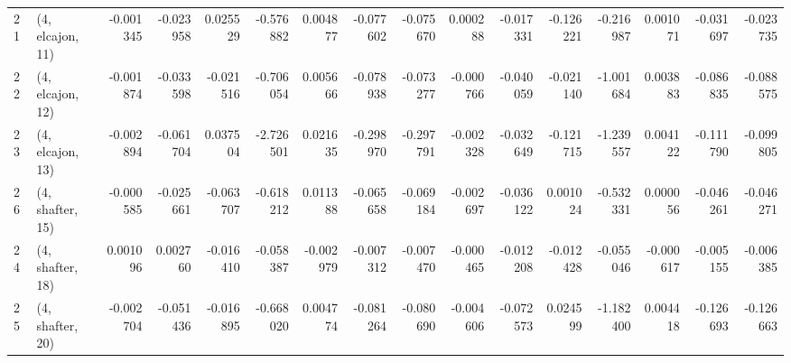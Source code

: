 \begin{tabular}{llrrrrrrrrrrrrrr}
21 &  (4, elcajon, 11) &  -0.001345 & -0.023958 &  0.025529 &  -0.576882 &  0.004877 &  -0.077602 & -0.075670 &  0.000288 & -0.017331 & -0.126221 &  -0.216987 &  0.001071 & -0.031697 & -0.023735 \\
22 &  (4, elcajon, 12) &  -0.001874 & -0.033598 & -0.021516 &  -0.706054 &  0.005666 &  -0.078938 & -0.073277 & -0.000766 & -0.040059 & -0.021140 &  -1.001684 &  0.003883 & -0.086835 & -0.088575 \\
23 &  (4, elcajon, 13) &  -0.002894 & -0.061704 &  0.037504 &  -2.726501 &  0.021635 &  -0.298970 & -0.297791 & -0.002328 & -0.032649 & -0.121715 &  -1.239557 &  0.004122 & -0.111790 & -0.099805 \\
26 &  (4, shafter, 15) &  -0.000585 & -0.025661 & -0.063707 &  -0.618212 &  0.011388 &  -0.065658 & -0.069184 & -0.002697 & -0.036122 &  0.001024 &  -0.532331 &  0.000056 & -0.046261 & -0.046271 \\
24 &  (4, shafter, 18) &   0.001096 &  0.002760 & -0.016410 &  -0.058387 & -0.002979 &  -0.007312 & -0.007470 & -0.000465 & -0.012208 & -0.012428 &  -0.055046 & -0.000617 & -0.005155 & -0.006385 \\
25 &  (4, shafter, 20) &  -0.002704 & -0.051436 & -0.016895 &  -0.668020 &  0.004774 &  -0.081264 & -0.080690 & -0.004606 & -0.072573 &  0.024599 &  -1.182400 &  0.004418 & -0.126693 & -0.126663 \\
\bottomrule
\end{tabular}

